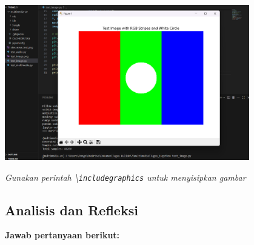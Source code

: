 \documentclass[11pt,a4paper]{article}
\begin{document}
\begin{itemize}
    \begin{minipage}{\linewidth}
        \centering
        \includegraphics[width=0.8\textwidth]{Figure/gambar image.png}
        \label{fig:test_image}
    \end{minipage}
\end{itemize}


\textit{Gunakan perintah \textbackslash\texttt{includegraphics} untuk menyisipkan gambar}

\subsection{Analisis dan Refleksi}
\textbf{Jawab pertanyaan berikut:}
\end{document}
